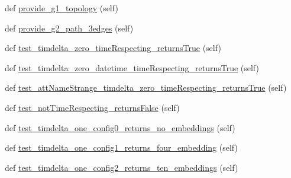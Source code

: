 \begin{DoxyCompactItemize}
\item 
def \hyperlink{classnetworkx_1_1algorithms_1_1isomorphism_1_1tests_1_1test__temporalisomorphvf2_1_1TestTimeRespectingGraphMatcher_a506fa7b4a5e1f8b0b5ddaa209d3c2a1e}{provide\+\_\+g1\+\_\+topology} (self)
\item 
def \hyperlink{classnetworkx_1_1algorithms_1_1isomorphism_1_1tests_1_1test__temporalisomorphvf2_1_1TestTimeRespectingGraphMatcher_a1ce8409e2cd5dcca7418f83549b80e9e}{provide\+\_\+g2\+\_\+path\+\_\+3edges} (self)
\item 
def \hyperlink{classnetworkx_1_1algorithms_1_1isomorphism_1_1tests_1_1test__temporalisomorphvf2_1_1TestTimeRespectingGraphMatcher_ab593a1b5f1b54b8667a5e12d99dbcc86}{test\+\_\+timdelta\+\_\+zero\+\_\+time\+Respecting\+\_\+returns\+True} (self)
\item 
def \hyperlink{classnetworkx_1_1algorithms_1_1isomorphism_1_1tests_1_1test__temporalisomorphvf2_1_1TestTimeRespectingGraphMatcher_a762881e75d03dc76ed4b42dc935f2f59}{test\+\_\+timdelta\+\_\+zero\+\_\+datetime\+\_\+time\+Respecting\+\_\+returns\+True} (self)
\item 
def \hyperlink{classnetworkx_1_1algorithms_1_1isomorphism_1_1tests_1_1test__temporalisomorphvf2_1_1TestTimeRespectingGraphMatcher_a9cabbdc5ef04413af00dda81e1a0490e}{test\+\_\+att\+Name\+Strange\+\_\+timdelta\+\_\+zero\+\_\+time\+Respecting\+\_\+returns\+True} (self)
\item 
def \hyperlink{classnetworkx_1_1algorithms_1_1isomorphism_1_1tests_1_1test__temporalisomorphvf2_1_1TestTimeRespectingGraphMatcher_a1d4f79cbc5dec2641510d15e16bc24f1}{test\+\_\+not\+Time\+Respecting\+\_\+returns\+False} (self)
\item 
def \hyperlink{classnetworkx_1_1algorithms_1_1isomorphism_1_1tests_1_1test__temporalisomorphvf2_1_1TestTimeRespectingGraphMatcher_ae2e708c18eecaf998a8748c82fafd357}{test\+\_\+timdelta\+\_\+one\+\_\+config0\+\_\+returns\+\_\+no\+\_\+embeddings} (self)
\item 
def \hyperlink{classnetworkx_1_1algorithms_1_1isomorphism_1_1tests_1_1test__temporalisomorphvf2_1_1TestTimeRespectingGraphMatcher_a9893fda1f567593c8294fd521636e2d3}{test\+\_\+timdelta\+\_\+one\+\_\+config1\+\_\+returns\+\_\+four\+\_\+embedding} (self)
\item 
def \hyperlink{classnetworkx_1_1algorithms_1_1isomorphism_1_1tests_1_1test__temporalisomorphvf2_1_1TestTimeRespectingGraphMatcher_aebdd6114e533311c0766a0a49318eab9}{test\+\_\+timdelta\+\_\+one\+\_\+config2\+\_\+returns\+\_\+ten\+\_\+embeddings} (self)
\end{DoxyCompactItemize}


